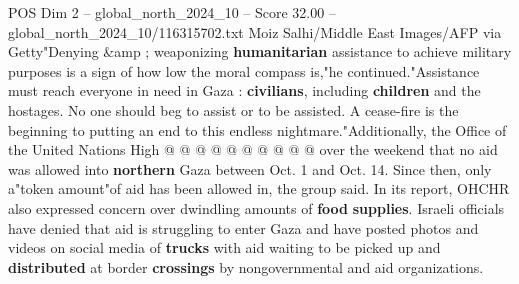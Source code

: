 \begin{textsample}{POS Dim 2 – global\_north\_2024\_10 – Score 32.00 – global\_north\_2024\_10/116315702.txt}
Moiz Salhi/Middle East Images/AFP via Getty"Denying \&amp ; weaponizing \textbf{humanitarian} assistance to achieve military purposes is a sign of how low the moral compass is,"he continued."Assistance must reach everyone in need in Gaza : \textbf{civilians}, including \textbf{children} and the hostages.
No one should beg to assist or to be assisted.
A cease-fire is the beginning to putting an end to this endless nightmare."Additionally, the Office of the United Nations High @ @ @ @ @ @ @ @ @ @ over the weekend that no aid was allowed into \textbf{northern} Gaza between Oct. 1 and Oct. 14.
Since then, only a"token amount"of aid has been allowed in, the group said.
In its report, OHCHR also expressed concern over dwindling amounts of \textbf{food} \textbf{supplies}.
Israeli officials have denied that aid is struggling to enter Gaza and have posted photos and videos on social media of \textbf{trucks} with aid waiting to be picked up and \textbf{distributed} at border \textbf{crossings} by nongovernmental and aid organizations.

\end{textsample}
